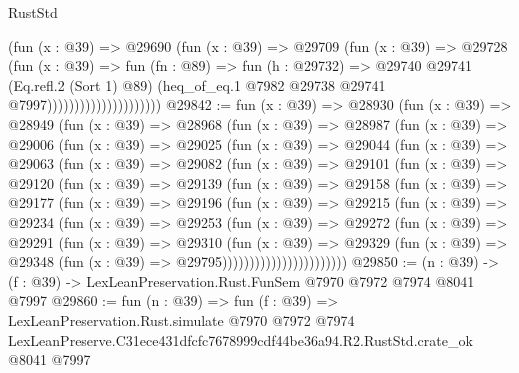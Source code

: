 \begin{lexlean}{RustStd}
\begin{coremodule}
                                    (fun (x : @39) =>
                                    @29690
                                      (fun (x : @39) =>
                                      @29709
                                        (fun (x : @39) =>
                                        @29728
                                          (fun (x : @39) =>
                                          fun (fn : @89) =>
                                          fun (h : @29732) =>
                                          @29740
                                            @29741
                                            (Eq.refl.{2} (Sort 1) @89)
                                            (heq_of_eq.{1}
                                              @7982
                                              @29738
                                              @29741
                                              @7997)))))))))))))))))))))
@29842 := fun (x : @39) =>
  @28930
    (fun (x : @39) =>
    @28949
      (fun (x : @39) =>
      @28968
        (fun (x : @39) =>
        @28987
          (fun (x : @39) =>
          @29006
            (fun (x : @39) =>
            @29025
              (fun (x : @39) =>
              @29044
                (fun (x : @39) =>
                @29063
                  (fun (x : @39) =>
                  @29082
                    (fun (x : @39) =>
                    @29101
                      (fun (x : @39) =>
                      @29120
                        (fun (x : @39) =>
                        @29139
                          (fun (x : @39) =>
                          @29158
                            (fun (x : @39) =>
                            @29177
                              (fun (x : @39) =>
                              @29196
                                (fun (x : @39) =>
                                @29215
                                  (fun (x : @39) =>
                                  @29234
                                    (fun (x : @39) =>
                                    @29253
                                      (fun (x : @39) =>
                                      @29272
                                        (fun (x : @39) =>
                                        @29291
                                          (fun (x : @39) =>
                                          @29310
                                            (fun (x : @39) =>
                                            @29329
                                              (fun (x : @39) =>
                                              @29348 (fun (x : @39) => @29795)))))))))))))))))))))))
@29850 := (n : @39) -> (f : @39) -> LexLeanPreservation.Rust.FunSem @7970 @7972 @7974 @8041 @7997
@29860 := fun (n : @39) =>
  fun (f : @39) =>
  LexLeanPreservation.Rust.simulate
    @7970
    @7972
    @7974
    LexLeanPreserve.C31ece431dfcfc7678999cdf44be36a94.R2.RustStd.crate_ok
    @8041
    @7997
\end{coremodule}
\end{lexlean}
